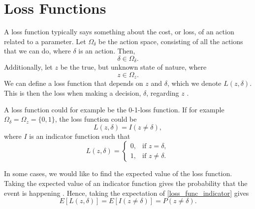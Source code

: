 \section{Loss Functions}
\label{theory_loss_functions}
A loss function typically says something about the cost, or loss, of an action related to a parameter. Let $\Omega_{\delta}$ be the action space, consisting of all the actions that we can do, where $\delta$ is an action. Then,
\begin{equation*}
    \delta \in \Omega_{\delta}.
\end{equation*}
Additionally, let $z$ be the true, but unknown state of nature, where 
\begin{equation*}
    z \in \Omega_z.
\end{equation*} 
We can define a loss function that depends on $z$ and $\delta$, which we denote $L(z,\delta)$. This is then the loss when making a decision, $\delta$, regarding $z$ \citep{statisticalDecisionTheoryLiese2008}.

A loss function could for example be the 0-1-loss function. If for example $\Omega_{\delta}= \Omega_z = \{0,1\}$, the loss function could be
\begin{equation}
\label{loss_func_indicator}
    L(z,\delta) = I(z \neq \delta),
\end{equation}
where $I$ is an indicator function such that
\begin{equation*}
    L(z,\delta) =
    \begin{cases}
        0,&  \text{if } z = \delta, \\
        1,&  \text{if } z \neq \delta.
    \end{cases}
\end{equation*}

In some cases, we would like to find the expected value of the loss function. Taking the expected value of an indicator function gives the probability that the event is happening \citep{algdat}. Hence, taking the expectation of \eqref{loss_func_indicator} gives
\begin{equation}
\label{expectation_of_loss_func_general}
    E[L(z,\delta)] = E[I(z\neq\delta)] = P(z\neq\delta).
\end{equation}



